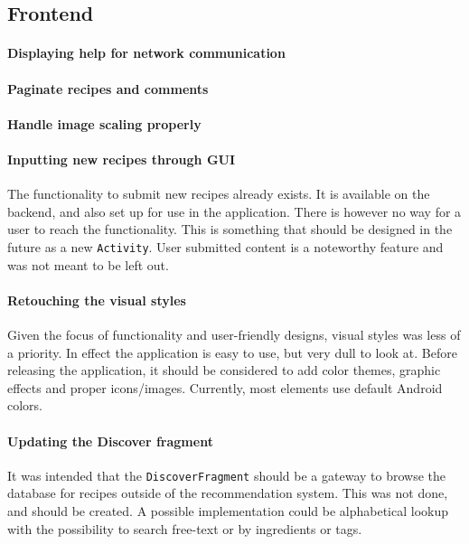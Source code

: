 \subsection{Frontend}

\paragraph{Displaying help for network communication}

\paragraph{Paginate recipes and comments}

\paragraph{Handle image scaling properly}

\paragraph{Inputting new recipes through GUI}
The functionality to submit new recipes already exists. It is available on the backend, and also set up for use in the application. There is however no way for a user to reach the functionality. This is something that should be designed in the future as a new \texttt{Activity}. User submitted content is a noteworthy feature and was not meant to be left out.

\paragraph{Retouching the visual styles}
Given the focus of functionality and user-friendly designs, visual styles was less of a priority. In effect the application is easy to use, but very dull to look at. Before releasing the application, it should be considered to add color themes, graphic effects and proper icons/images. Currently, most elements use default Android colors.

\paragraph{Updating the Discover fragment}
It was intended that the \texttt{DiscoverFragment} should be a gateway to browse the database for recipes outside of the recommendation system. This was not done, and should be created. A possible implementation could be alphabetical lookup with the possibility to search free-text or by ingredients or tags.

